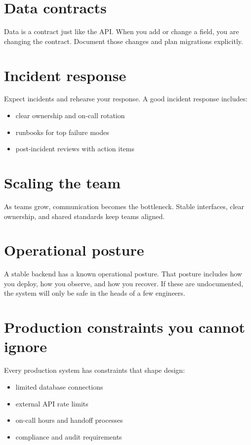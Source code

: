 \section{Data contracts}
Data is a contract just like the API.
When you add or change a field, you are changing the contract.
Document those changes and plan migrations explicitly.

\section{Incident response}
Expect incidents and rehearse your response.
A good incident response includes:
\begin{itemize}[nosep]
  \item clear ownership and on-call rotation
  \item runbooks for top failure modes
  \item post-incident reviews with action items
\end{itemize}

\section{Scaling the team}
As teams grow, communication becomes the bottleneck.
Stable interfaces, clear ownership, and shared standards keep teams aligned.

\section{Operational posture}
A stable backend has a known operational posture.
That posture includes how you deploy, how you observe, and how you recover.
If these are undocumented, the system will only be safe in the heads of a few engineers.

\section{Production constraints you cannot ignore}
Every production system has constraints that shape design:
\begin{itemize}[nosep]
  \item limited database connections
  \item external API rate limits
  \item on-call hours and handoff processes
  \item compliance and audit requirements
\end{itemize}

